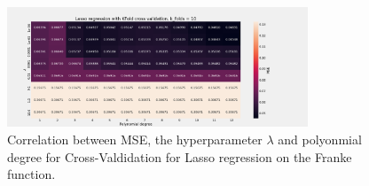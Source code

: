 \begin{figure}[H]
	\caption{Correlation between MSE, the hyperparameter $\lambda$ and polyonmial degree for Cross-Valdidation for Lasso regression on the Franke function.}
	\label{fig:f_lasso_kflod}
    \centering
    \includegraphics[width=0.8\textwidth]{Figures/f_lasso_kfold_n_10.png}
\end{figure}



 








